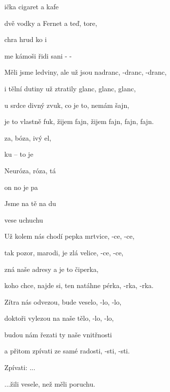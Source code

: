 

\zs
{}ička cigaret a  kafe   

dvě vodky a Fernet a teď, tore,   

chra hrud ko  i

me kámoši řidi sani - -
\ks

\zs
Měli jsme ledviny, ale už jsou nadranc, -dranc, -dranc,

i tělní dutiny už ztratily glanc, glanc, glanc,

u srdce divný zvuk, co je to, nemám šajn,

je to vlastně fuk, žijem fajn, žijem fajn, fajn, fajn.
\ks

\zr
{}za, bóza, ivý el,

ku --  to je 

Neuróza, róza, tá 

on no  je pa

Jsme  na tě  na du

 vese uchuchu
\kr

\zs
Už kolem nás chodí pepka mrtvice, -ce, -ce,

tak pozor, marodi, je zlá velice, -ce, -ce,

zná naše adresy a je to čiperka,

koho chce, najde si, ten natáhne pérka, -rka, -rka.
\ks

\zs
Zítra nás odvezou, bude veselo, -lo, -lo,

doktoři vylezou na naše tělo, -lo, -lo,

budou nám řezati ty naše vnitřnosti

a přitom zpívati ze samé radosti, -sti, -sti.
\ks

\zr
Zpívati: ...

...žili vesele, než měli poruchu.
\kr


\kp





